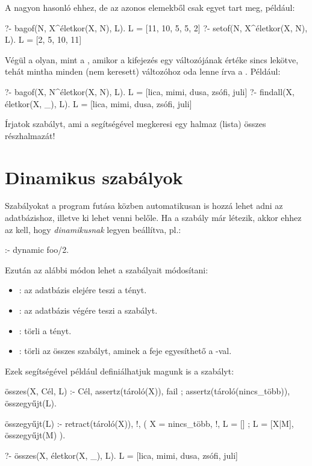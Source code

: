 A  nagyon hasonló ehhez, de az azonos
elemekből csak egyet tart meg, például:
\begin{query}
?- bagof(N, X^életkor(X, N), L).
L = [11, 10, 5, 5, 2]
?- setof(N, X^életkor(X, N), L).
L = [2, 5, 10, 11]
\end{query}

Végül a  olyan, mint a ,
amikor a kifejezés egy változójának értéke sincs
lekötve, tehát mintha minden (nem keresett) 
változóhoz oda lenne írva a
. Például:
\begin{query}
?- bagof(X, N^életkor(X, N), L).
L = [lica, mimi, dusa, zsófi, juli]
?- findall(X, életkor(X, _), L).
L = [lica, mimi, dusa, zsófi, juli]
\end{query}

\begin{problem}
Írjatok szabályt, ami a  segítségével
megkeresi egy halmaz (lista) összes részhalmazát!
\end{problem}

\section{Dinamikus szabályok}
Szabályokat a program futása közben automatikusan is
hozzá lehet adni az adatbázishoz, illetve ki lehet
venni belőle. Ha a szabály már létezik, akkor ehhez
az kell, hogy \emph{dinamikusnak} legyen beállítva,
pl.:
\begin{program}
:- dynamic foo/2. %
\end{program}
Ezután az alábbi módon lehet a  szabályait
módosítani:
\begin{itemize}
\item {} : az adatbázis
  elejére teszi a  tényt.
\item {} : az
  adatbázis végére teszi a 
  szabályt.
\item {} : törli a
   tényt.
\item {} : törli az összes
  szabályt, aminek a feje egyesíthető a
  -val.
\end{itemize}
Ezek segítségével például definiálhatjuk magunk is a
 szabályt:
\begin{program}
összes(X, Cél, L) :-
    Cél, assertz(tároló(X)), fail
    ; assertz(tároló(nincs_több)), összegyűjt(L).

összegyűjt(L) :-
    retract(tároló(X)), !,
    ( X = nincs_több, !, L = []
    ; L = [X|M], összegyűjt(M)
    ).
\end{program}
\begin{query}
?- összes(X, életkor(X, _), L).
L = [lica, mimi, dusa, zsófi, juli]
\end{query}


